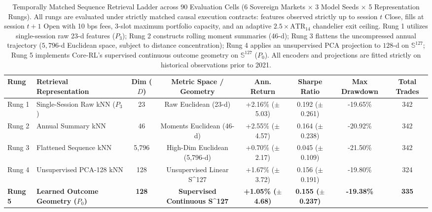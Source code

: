 \begin{table}[t]
\centering
\small
\begin{tabular}{llcccccc}
\toprule
\textbf{Rung} & \textbf{Retrieval Representation} & \textbf{Dim ($D$)} & \textbf{Metric Space / Geometry} & \textbf{Ann. Return} & \textbf{Sharpe Ratio} & \textbf{Max Drawdown} & \textbf{Total Trades} \\
\midrule
Rung 1 & Single-Session Raw kNN ($P_3$) & 23 & Raw Euclidean (23-d) & +2.16\% ($\pm$5.03) & 0.192 ($\pm$0.261) & -19.65\% & 342 \\
Rung 2 & Annual Summary kNN & 46 & Moments Euclidean (46-d) & +2.55\% ($\pm$4.57) & 0.164 ($\pm$0.238) & -20.92\% & 342 \\
Rung 3 & Flattened Sequence kNN & 5,796 & High-Dim Euclidean (5,796-d) & +0.70\% ($\pm$2.17) & 0.045 ($\pm$0.109) & -21.50\% & 342 \\
Rung 4 & Unsupervised PCA-128 kNN & 128 & Unsupervised Linear S^127 & +1.67\% ($\pm$3.72) & 0.156 ($\pm$0.191) & -19.80\% & 324 \\
\textbf{Rung 5} & \textbf{Learned Outcome Geometry ($P_0$)} & \textbf{128} & \textbf{Supervised Continuous S^127} & \textbf{+1.05\% ($\pm$4.68)} & \textbf{0.155 ($\pm$0.237)} & \textbf{-19.38\%} & \textbf{335} \\
\bottomrule
\end{tabular}
\caption{Temporally Matched Sequence Retrieval Ladder across 90 Evaluation Cells (6 Sovereign Markets $\times$ 3 Model Seeds $\times$ 5 Representation Rungs). All rungs are evaluated under strictly matched causal execution contracts: features observed strictly up to session $t$ Close, fills at session $t+1$ Open with 10 bps fees, 3-slot maximum portfolio capacity, and an adaptive $2.5\times\text{ATR}_{14}$ chandelier exit ceiling. Rung 1 utilizes single-session raw 23-d features ($P_3$); Rung 2 constructs rolling moment summaries (46-d); Rung 3 flattens the uncompressed annual trajectory ($5,796$-d Euclidean space, subject to distance concentration); Rung 4 applies an unsupervised PCA projection to $128$-d on $\mathbb{S}^{127}$; Rung 5 implements Core-RL's supervised continuous outcome geometry on $\mathbb{S}^{127}$ ($P_0$). All encoders and projections are fitted strictly on historical observations prior to 2021.}
\label{tab:temporally_matched_retrieval_ladder}
\end{table}

